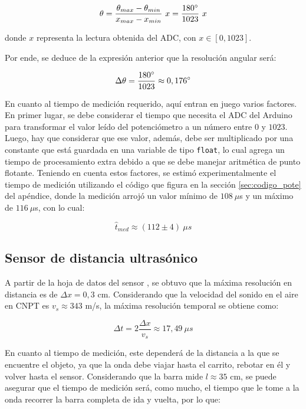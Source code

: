 \documentclass[a4paper, twoside, 10pt, spanish]{article}
\numberwithin{table}{section}
\begin{document}
\begin{equation}
    \theta = \frac{\theta_{max} - \theta_{min}}{x_{max} - x_{min}} \ x = \frac{180 \degree}{1023} \ x
\end{equation}

donde $x$ representa la lectura obtenida del ADC, con $x \in [0, 1023]$.

Por ende, se deduce de la expresión anterior que la resolución angular será:

\begin{equation*}
    \Delta \theta = \frac{180 \degree}{1023} \approx 0,176 \degree
\end{equation*}

En cuanto al tiempo de medición requerido, aquí entran en juego varios factores. En primer lugar, se debe considerar el tiempo que necesita el ADC del Arduino para transformar el valor leído del potenciómetro a un número entre $0$ y $1023$. Luego, hay que considerar que ese valor, además, debe ser multiplicado por una constante que está guardada en una variable de tipo \texttt{float}, lo cual agrega un tiempo de procesamiento extra debido a que se debe manejar aritmética de punto flotante. Teniendo en cuenta estos factores, se estimó experimentalmente el tiempo de medición utilizando el código que figura en la sección \ref{sec:codigo_pote} del apéndice, donde la medición arrojó un valor mínimo de $108 \ \mu$s y un máximo de $116 \ \mu$s, con lo cual:

\begin{equation*}
    \hat{t}_{med} \approx (112 \pm 4) \ \mu s
\end{equation*}

\subsection{Sensor de distancia ultrasónico}

A partir de la hoja de datos del sensor \cite{hcsr04}, se obtuvo que la máxima resolución en distancia es de $\Delta x = 0,3$ cm. Considerando que la velocidad del sonido en el aire en CNPT es $v_s \approx 343$ m/s, la máxima resolución temporal se obtiene como:

\begin{equation*}
    \Delta t = 2 \frac{\Delta x}{v_s} \approx 17,49 \ \mu s
\end{equation*}

En cuanto al tiempo de medición, este dependerá de la distancia a la que se encuentre el objeto, ya que la onda debe viajar hasta el carrito, rebotar en él y volver hasta el sensor. Considerando que la barra mide $l \approx 35$ cm, se puede asegurar que el tiempo de medición será, como mucho, el tiempo que le tome a la onda recorrer la barra completa de ida y vuelta, por lo que:
\end{document}
